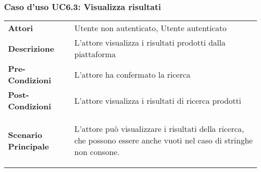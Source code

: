 \subsubsection{Caso d'uso UC6.3: Visualizza risultati}
\label{UC6_3}

\begin{minipage}{\linewidth}
	\begin{tabular}{ l | p{11cm}}
		\hline
		\rowcolor{Gray}
		\multicolumn{2}{c}{UC6.3 - Visualizza risultati} \\
		\hline
		\textbf{Attori} & Utente non autenticato, Utente autenticato \\
		\textbf{Descrizione} & L'attore visualizza i risultati prodotti dalla piattaforma\\
		\textbf{Pre-Condizioni} & L'attore ha confermato la ricerca\\
		\textbf{Post-Condizioni} & L'attore visualizza i risultati di ricerca prodotti \\
		\textbf{Scenario Principale} & 
		\begin{enumerate*}[label=(\arabic*.),itemjoin={\newline}]
			\item L'attore può visualizzare i risultati della ricerca, che possono essere anche vuoti nel caso di stringhe non consone.
		\end{enumerate*}\\
	\end{tabular}
\end{minipage}